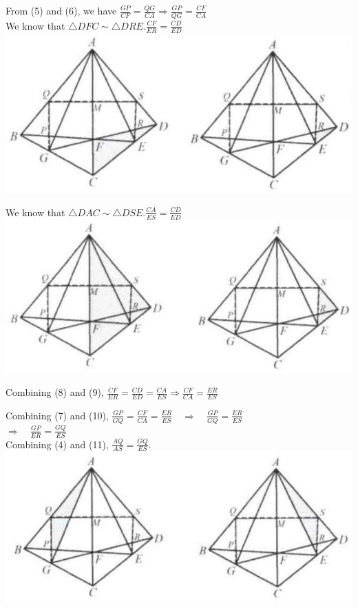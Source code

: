 \documentclass[10pt]{article}
\begin{document}
From (5) and (6), we have \(\frac{G P}{C F}=\frac{Q G}{C A} \Rightarrow \frac{G P}{Q G}=\frac{C F}{C A}\)\\
We know that \(\triangle D F C \sim \triangle D R E . \frac{C F}{E R}=\frac{C D}{E D}\)\\
\includegraphics[max width=\textwidth, center]{2025_04_17_97bc1f7e44d93c271a88g-144(1)}

We know that \(\triangle D A C \sim \triangle D S E . \frac{C A}{E S}=\frac{C D}{E D}\)\\
\includegraphics[max width=\textwidth, center]{2025_04_17_97bc1f7e44d93c271a88g-144}

Combining (8) and (9), \(\frac{C F}{E R}=\frac{C D}{E D}=\frac{C A}{E S} \Rightarrow \frac{C F}{C A}=\frac{E R}{E S}\)

Combining (7) and (10), \(\frac{G P}{G Q}=\frac{C F}{C A}=\frac{E R}{E S} \quad \Rightarrow \quad \frac{G P}{G Q}=\frac{E R}{E S}\)\\
\(\Rightarrow \quad \frac{G P}{E R}=\frac{G Q}{E S}\)\\
Combining (4) and (11), \(\frac{A Q}{A S}=\frac{G Q}{E S}\).\\
\includegraphics[max width=\textwidth, center]{2025_04_17_97bc1f7e44d93c271a88g-145}
\end{document}
